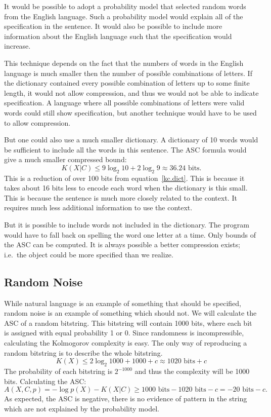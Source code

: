 It would be possible to adopt a probability model that selected random words from the English language.
Such a probability model would explain all of the specification in the sentence.
It would also be possible to include more information about the English language such that the specification would increase.

This technique depends on the fact that the numbers of words in the English language is much smaller then the number of possible combinations of letters.
If the dictionary contained every possible combination of letters up to some finite length, it would not allow compression, and thus we would not be able to indicate specification.
A language where all possible combinations of letters were valid words could still show specification, but another technique would have to be used to allow compression.

But one could also use a much smaller dictionary.
A dictionary of 10 words would be sufficient to include all the words in this sentence.
The ASC formula would give a much smaller compressed bound:
\begin{equation}
    K(X|C) \leq 9 \log_2 10 + 2 \log_2 9 \approx 36.24 \mbox{ bits.}
\end{equation}
This is a reduction of over 100 bits from equation~\ref{kc.dict}.
This is because it takes about 16 bits less to encode each word when the dictionary is this small.
This is because the sentence is much more closely related to the context.
It requires much less additional information to use the context.

But it is possible to include words not included in the dictionary.
The program would have to fall back on spelling the word one letter at a time.
Only bounds of the ASC can be computed.
It is always possible a better compression exists; i.e.\ the object could be more specified than we realize.

\subsection{Random Noise}

While natural language is an example of something that should be specified, random noise is an example of something which should not.
We will calculate the ASC of a random bitstring.
This bitstring will contain 1000 bits, where each bit is assigned with equal probability 1 or 0.
Since randomness is incompressible, calculating the Kolmogorov complexity is easy.
The only way of reproducing a random bitstring is to describe the whole bitstring.
\begin{equation}
    K(X) \leq 2 \log_2 1000 + 1000 + c \approx 1020 \mbox{ bits} + c
\end{equation}
The probability of each bitstring is $2^{-1000}$ and thus the complexity will be 1000 bits.
Calculating the ASC:
\begin{equation}
    A(X,C,p) = - \log p(X) - K(X|C) \geq 1000 \mbox{ bits} - 1020 \mbox{ bits} - c = -20 \mbox{ bits} - c \mbox{.}
\end{equation}
As expected, the ASC is negative, there is no evidence of pattern in the string which are not explained by the probability model.

